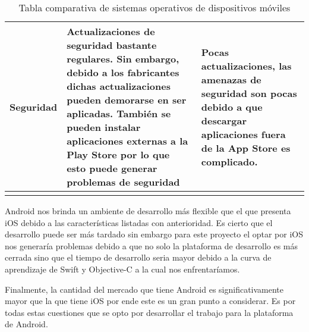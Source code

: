 \begin{center}
\begin{longtable}{|J{3cm}|J{5cm}|J{5cm}|}
    Seguridad & Actualizaciones de seguridad bastante regulares. Sin embargo, debido a los fabricantes dichas actualizaciones pueden demorarse en ser aplicadas. También se pueden instalar aplicaciones externas a la Play Store por lo que esto puede generar problemas de seguridad & Pocas actualizaciones, las amenazas de seguridad son pocas debido a que descargar aplicaciones fuera de la App Store es complicado. \\ \hline
    \caption{Tabla comparativa de sistemas operativos de dispositivos móviles}
    \label{tbl:comparativa-moviles}
    \end{longtable}
\end{center}

Android nos brinda un ambiente de desarrollo más flexible que el que presenta iOS debido a las características listadas con anterioridad. Es cierto que el desarrollo puede ser más tardado sin embargo para este proyecto el optar por iOS nos generaría problemas debido a que no solo la plataforma de desarrollo es más cerrada sino que el tiempo de desarrollo seria mayor debido a la curva de aprendizaje de Swift y Objective-C a la cual nos enfrentaríamos.

Finalmente, la cantidad del mercado que tiene Android es significativamente mayor que la que tiene iOS por ende este es un gran punto a considerar. Es por todas estas cuestiones que se opto por desarrollar el trabajo para la plataforma de Android.